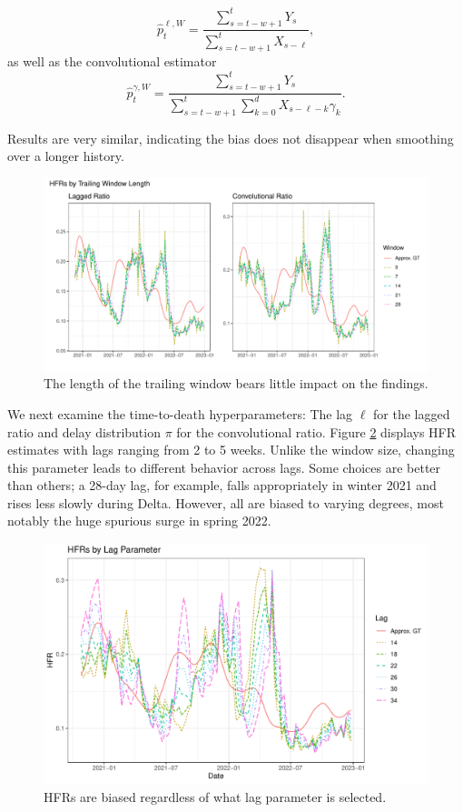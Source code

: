 \documentclass{article}
\begin{document}
\begin{equation}\label{eq:laggedSmooth}
    \hat{p}_t^{\ell, W} = \frac{\sum_{s=t-w+1}^{t} Y_s}{\sum_{s=t-w+1}^{t} X_{s-\ell}},
\end{equation}
\noindent as well as the convolutional estimator
\begin{equation}\label{eq:convSmooth}
    \hat{p}_t^{\gamma, W} = \frac{\sum_{s=t-w+1}^{t} Y_s}{\sum_{s=t-w+1}^{t} \sum_{k=0}^d X_{s-\ell-k}\gamma_k}.
\end{equation}

\noindent Results are very similar, indicating the bias does not disappear when smoothing over a longer history. 

\begin{figure}
    \centering
    \includegraphics[width=0.75\linewidth]{Figs/Real/window_size.pdf}
    \caption{The length of the trailing window bears little impact on the findings.}
    \label{fig:window}
\end{figure}

We next examine the time-to-death hyperparameters: The lag $\ell$ for the lagged ratio and delay distribution $\pi$ for the convolutional ratio. Figure \ref{fig:lag} displays HFR estimates with lags ranging from 2 to 5 weeks. Unlike the window size, changing this parameter leads to different behavior across lags. Some choices are better than others; a 28-day lag, for example, falls appropriately in winter 2021 and rises less slowly during Delta. However, all are biased to varying degrees, most notably the huge spurious surge in spring 2022.

\begin{figure}
    \centering
    \includegraphics[width=0.7\linewidth]{Figs/Real/hfrs_by_lag.pdf}
    \caption{HFRs are biased regardless of what lag parameter is selected.}
    \label{fig:lag}
\end{figure}
\end{document}
